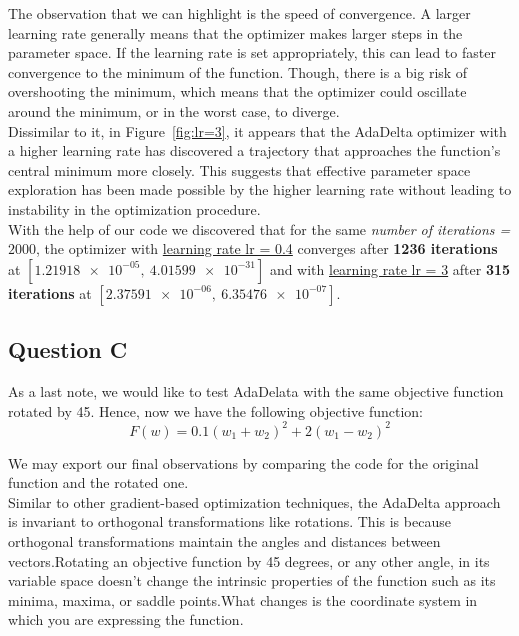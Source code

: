 The observation that we can highlight is the speed of convergence. A larger learning rate generally means that the optimizer makes larger steps in the parameter space. If the learning rate is set appropriately, this can lead to faster convergence to the minimum of the function. Though, there is a big risk of overshooting the minimum, which means that the optimizer could oscillate around the minimum, or in the worst case, to diverge.\\
Dissimilar to it, in Figure~\ref{fig:lr=3}, it appears that the AdaDelta optimizer with a higher learning rate has discovered a trajectory that approaches the function's central minimum more closely. This suggests that effective parameter space exploration has been made possible by the higher learning rate without leading to instability in the optimization procedure.\\
With the help of our code we discovered that for the same \textit{number of iterations = $2000$}, the optimizer with \underline{learning rate lr = 0.4} converges after \textbf{1236 iterations} at $\left[\num{1.21918e-05},\ \num{4.01599e-31}\right]$  and with \underline{learning rate lr = 3} after \textbf{315 iterations} at $\left[\num{2.37591e-06},\ \num{6.35476e-07}\right]$.
\vspace{2mm}

\subsection{Question C}
As a last note, we would like to test AdaDelata with the same objective function rotated by 45\degree. Hence, now we have the following objective function:
\begin{equation}
	F(w) = 0.1(w_1 + w_2)^2 + 2(w_1 - w_2)^2
\end{equation}
\label{eq:RotatedFuncproblem8}
\vspace{1mm}

We may export our final observations by comparing the code for the original function and the rotated one.\\

Similar to other gradient-based optimization techniques, the AdaDelta approach is invariant to orthogonal transformations like rotations. This is because orthogonal transformations maintain the angles and distances between vectors.Rotating an objective function by 45 degrees, or any other angle, in its variable space doesn't change the intrinsic properties of the function such as its minima, maxima, or saddle points.What changes is the coordinate system in which you are expressing the function.

